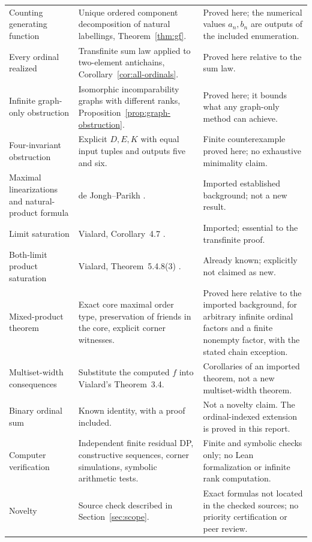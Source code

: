 \documentclass[11pt,letterpaper]{article}
\theoremstyle{definition}
\theoremstyle{remark}
\begin{document}
\begin{longtable}{@{}p{}p{}p{}@{}}
Counting generating function & Unique ordered component decomposition of
natural labellings, Theorem~\ref{thm:gf}. & Proved here; the numerical
values $a_n,b_n$ are outputs of the included enumeration.\\
Every ordinal realized & Transfinite sum law applied to two-element
antichains, Corollary~\ref{cor:all-ordinals}. & Proved here relative to the
sum law.\\
Infinite graph-only obstruction & Isomorphic incomparability graphs with
different ranks, Proposition~\ref{prop:graph-obstruction}. & Proved here;
it bounds what any graph-only method can achieve.\\
Four-invariant obstruction & Explicit $D,E,K$ with equal input tuples and
outputs five and six. & Finite counterexample proved here; no exhaustive
minimality claim.\\
Maximal linearizations and natural-product formula & de Jongh--Parikh
\cite{DeJonghParikh}. & Imported established background; not a new result.\\
Limit saturation & Vialard, Corollary~4.7 \cite{Vialard2023}. & Imported;
essential to the transfinite proof.\\
Both-limit product saturation & Vialard, Theorem~5.4.8(3)
\cite{VialardThesis}. & Already known; explicitly not claimed as new.\\
Mixed-product theorem & Exact core maximal order type, preservation of
friends in the core, explicit corner witnesses. & Proved here relative
to the imported background, for arbitrary infinite ordinal factors and a
finite nonempty factor, with the stated chain exception.\\
Multiset-width consequences & Substitute the computed $f$ into Vialard's
Theorem~3.4. & Corollaries of an imported theorem, not a new multiset-width
theorem.\\
Binary ordinal sum & Known identity, with a proof included. & Not a
novelty claim. The ordinal-indexed extension is proved in this report.\\
Computer verification & Independent finite residual DP, constructive
sequences, corner simulations, symbolic arithmetic tests. & Finite and
symbolic checks only; no Lean formalization or infinite rank computation.\\
Novelty & Source check described in Section~\ref{sec:scope}. & Exact
formulas not located in the checked sources; no priority certification or
peer review.\\
\bottomrule
\end{longtable}
\normalsize
\end{document}
